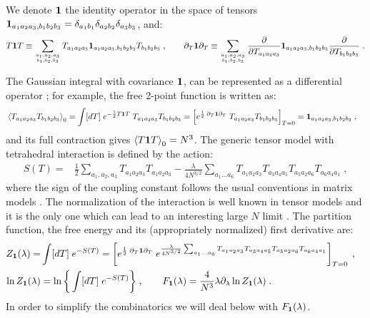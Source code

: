 \documentclass[10pt]{article}
\theoremstyle{plain}
\theoremstyle{definition}
\begin{document}
We denote ${\bf 1}$ the identity operator in the space of tensors ${\bf 1}_{a_1a_2a_3,b_1b_2b_3}= \delta_{a_1b_1} \delta_{a_2b_2} \delta_{a_3b_3}$, and:
\[
T {\bf 1} T  \equiv \sum_{\genfrac{}{}{0pt}{}{a_1,a_2,a_3}{b_1,b_2,b_3}}  T_{a_1a_2a_3}  {\bf 1}_{a_1a_2a_3,b_1b_2b_3}  T_{b_1b_2b_3}  \;,\qquad 
  \partial_T {\bf 1} \partial_T \equiv \sum_{\genfrac{}{}{0pt}{}{a_1,a_2,a_3}{b_1,b_2,b_3}} \frac{\partial}{\partial T_{a_1a_2a_3}} {\bf 1}_{a_1a_2a_3,b_1b_2b_3} \frac{\partial}{\partial T_{b_1b_2b_3}}  \;.
\] 
 
The Gaussian integral with covariance ${\bf 1}$, can be represented as a differential operator \cite{RTM,Brydges:2014nba,salmhofer1999renormalization}; for example, the free 2-point function is written as:
\begin{align*}
 & \Braket{ T_{a_1a_2a_3} T_{b_1b_2b_3}  }_0    =  \int [dT] \; e^{-\frac{1}{2} T {\bf 1} T}  \; T_{a_1a_2a_3} T_{b_1b_2b_3} = 
  \left[ e^{\frac{1}{2} \;  \partial_T {\bf 1} \partial_T    }      \;  T_{a_1a_2a_3} T_{b_1b_2b_3}
\right]_{T=0} =   {\bf 1}_{a_1a_2a_3,b_1b_2b_3} \;,
\end{align*}
and its full contraction gives $\Braket{T {\bf 1} T}_0  =  N^3$. The generic tensor model with tetrahedral interaction is defined by the action:
\begin{align} \label{eq:action}
 S(T) = & \frac{1}{2} \sum_{a_1 , a_2 , a_3}  T_{a_1a_2a_3}   T_{a_1a_2a_3} - \frac{  \lambda  }{ 4 N^{3/2}}   
 \sum_{a_1\dots a_6}  T_{a_1a_2a_3}   T_{a_3a_4a_5}    T_{a_5 a_2 a_6}  T_{a_6a_4 a_1} \;, 
\end{align}
where the sign of the coupling constant follows the usual conventions in matrix models \cite{DiFrancesco:1993nw}.
The normalization of the interaction is well known in tensor models and it is the only one which can lead to an interesting large $N$ 
limit \cite{RTM,Carrozza:2015adg,Klebanov:2017nlk}. The partition function, the free energy and its (appropriately normalized) first derivative are:
\begin{align}\label{eq:modelgen}
 Z_{\bf 1}(\lambda) = &    \int [ dT] \; e^{-S(T)} = \left[ e^{\frac{1}{2} \;   \partial_T {\bf 1} \partial_T   }      \; e^{  \frac{  \lambda  }{4 N^{3/2}}   
 \sum_{a_1\dots a_6}  T_{a_1a_2a_3}   T_{a_3a_4a_5}    T_{a_5 a_2 a_6}  T_{a_6a_4 a_1} } \right]_{T=0} \;, \crcr
 \ln Z_{\bf 1}(\lambda) & = \ln\bigg\{ \int [ dT] \; e^{-S(T)} \bigg\} \; , \qquad F_{\bf 1}(\lambda) = \frac{4}{N^3} \lambda\partial_{\lambda} \ln Z_{\bf 1}(\lambda)  \;.
\end{align}
In order to simplify the combinatorics we will deal below with $F_{\bf 1}(\lambda)$.
\end{document}
